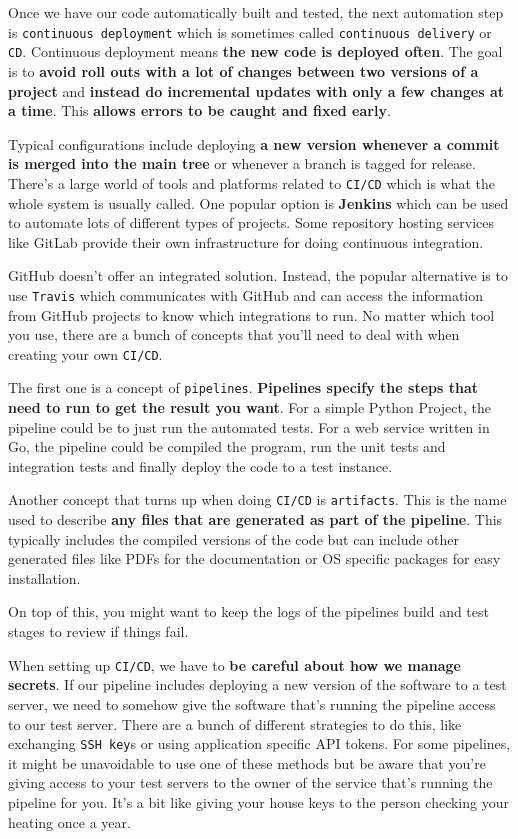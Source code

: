 	Once we have our code automatically built and tested, the next automation step is \texttt{continuous deployment} which is sometimes called \texttt{continuous delivery} or \texttt{CD}. Continuous deployment means \textbf{the new code is deployed often}. The goal is to \textbf{avoid roll outs with a lot of changes between two versions of a project} and \textbf{instead do incremental updates with only a few changes at a time}. This \textbf{allows errors to be caught and fixed early}. 
	
	Typical configurations include deploying\textbf{ a new version whenever a commit is merged into the main tree} or whenever a branch is tagged for release. There's a large world of tools and platforms related to \verb|CI/CD| which is what the whole system is usually called. One popular option is \textbf{Jenkins} which can be used to automate lots of different types of projects. Some repository hosting services like GitLab provide their own infrastructure for doing continuous integration. 
	
	GitHub doesn't offer an integrated solution. Instead, the popular alternative is to use \verb|Travis| which communicates with GitHub and can access the information from GitHub projects to know which integrations to run. No matter which tool you use, there are a bunch of concepts that you'll need to deal with when creating your own \verb|CI/CD|.
	
	The first one is a concept of \texttt{pipelines}. \textbf{Pipelines specify the steps that need to run to get the result you want}. 
	For a simple Python Project, the pipeline could be to just run the automated tests. 
	For a web service written in Go, the pipeline could be compiled the program, run the unit tests and integration tests and finally deploy the code to a test instance. 
	
	Another concept that turns up when doing \verb|CI/CD| is \texttt{artifacts}. This is the name used to describe \textbf{any files that are generated as part of the pipeline}. 
	This typically includes the compiled versions of the code but can include other generated files like PDFs for the documentation or OS specific packages for easy installation. 

	On top of this, you might want to keep the logs of the pipelines build and test stages to review if things fail. 
	
	When setting up \verb|CI/CD|, we have to \textbf{be careful about how we manage secrets}. If our pipeline includes deploying a new version of the software to a test server, we need to somehow give the software that's running the pipeline access to our test server. 
	There are a bunch of different strategies to do this, like exchanging \texttt{SSH key}s or using application specific API tokens. 
	For some pipelines, it might be unavoidable to use one of these methods but be aware that you're giving access to your test servers to the owner of the service that's running the pipeline for you. 
	It's a bit like giving your house keys to the person checking your heating once a year. 
	
